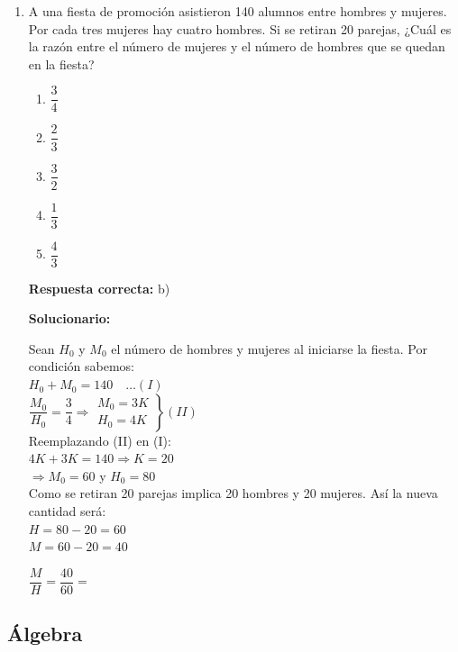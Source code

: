 \begin{enumerate}
	\vspace{6mm}
	
	\item A una fiesta de promoción asistieron 140 alumnos entre hombres y mujeres. Por cada tres mujeres hay cuatro hombres. Si se retiran 20 parejas, ¿Cuál es la razón entre el número de mujeres y el número de hombres que se quedan en la fiesta?
	\begin{enumerate}[label=\alph*)]
		\item $\dfrac{3}{4}$
		\item $\dfrac{2}{3}$
		\item $\dfrac{3}{2}$
		\item $\dfrac{1}{3}$
		\item $\dfrac{4}{3}$
	\end{enumerate}
	\textbf{Respuesta correcta:} b)
	
	\vspace{2mm}
	\textbf{Solucionario:}
	
	Sean $H_0$ y $M_0$ el número de hombres y mujeres al iniciarse la fiesta. Por condición sabemos:\\
	
	$H_0 + M_0 = 140 \quad \dots (I)$\\
	
	$\dfrac{M_0}{H_0} = \dfrac{3}{4} \Rightarrow \left. \begin{array}{l} M_0 = 3K \\ H_0 = 4K \end{array} \right\} (II)$\\
	
	Reemplazando (II) en (I):\\
	
	$4K + 3K = 140 \Rightarrow K = 20$\\
	
	$\Rightarrow M_0 = 60$ y $H_0 = 80$\\
	
	Como se retiran 20 parejas implica 20 hombres y 20 mujeres. Así la nueva cantidad será:\\	
	$H = 80 - 20 = 60$\\
	$M = 60 - 20 = 40$
	
	$\dfrac{M}{H} = \dfrac{40}{60} =$
	
	
	\vspace{6mm}
	
\end{enumerate}


\subsection*{Álgebra}

